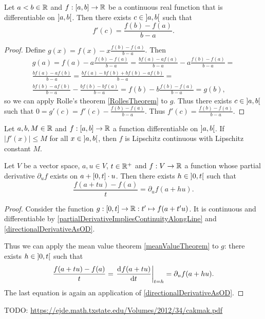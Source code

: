 \begin{theorem} \label{meanValueTheorem}
Let $a<b\in \mathbb{R}$ and $f: \interval{a,b}\to \R$ be a continuous real function that is differentiable on $\interval[o]{a,b}$. Then there exists $c\in \interval[o]{a,b}$ such that
\[f'(c) = \frac{f(b)-f(a)}{b-a}. \]
\end{theorem}
\begin{proof}
Define $g(x) = f(x) - x\frac{f(b)-f(a)}{b-a}$. Then
\begin{multline*}
g(a) = f(a) - a\frac{f(b)-f(a)}{b-a} = \frac{bf(a) - af(a)}{b-a} - a\frac{f(b)-f(a)}{b-a} = \\ \frac{bf(a)-af(b)}{b-a} = \frac{bf(a)-bf(b) + bf(b)-af(b)}{b-a} = \\ \frac{bf(b) - af(b)}{b-a} - \frac{bf(b) - bf(a)}{b-a} = f(b) - b \frac{f(b)-f(a)}{b-a} = g(b),
\end{multline*}
so we can apply Rolle's theorem \ref{RollesTheorem} to $g$. Thus there exists $c\in \interval[o]{a,b}$ such that $0 = g'(c) = f'(c) - \frac{f(b)-f(a)}{b-a}$. Thus $f'(c) = \frac{f(b)-f(a)}{b-a}$.
\end{proof}
\begin{corollary}
Let $a,b, M\in \mathbb{R}$ and $f:\interval{a,b}\to \R$ a function differentiable on $\interval[o]{a,b}$. If $|f'(x)| \leq M$ for all $x\in \interval[o]{a,b}$, then $f$ is Lipschitz continuous with Lipschitz constant $M$.
\end{corollary}
\begin{corollary} \label{partialDerivativeMeanValueTheorem}
Let $V$ be a vector space, $a,u\in V$, $t\in\mathbb{R}^+$ and $f: V\to \mathbb{R}$ a function whose partial derivative $\partial_u f$ exists on $a+\interval{0,t}\cdot u$. Then there exists $h\in \interval[o]{0,t}$ such that
\[ \frac{f(a+tu) - f(a)}{t} = \partial_u f(a+hu). \]
\end{corollary}
\begin{proof}
Consider the function $g: \interval{0,t} \to \R: t'\mapsto f(a+t'u)$. It is continuous and differentiable by \ref{partialDerivativeImpliesContinuityAlongLine} and \ref{directionalDerivativeAsOD}.

Thus we can apply the mean value theorem \ref{meanValueTheorem} to $g$: there exists $h\in \interval[o]{0,t}$ such that
\[ \frac{f(a+tu) - f(a)}{t} = \left.\mathinner{ \dfrac{\operatorname{d \!}{^{}}f(a+tu)}{\operatorname{d \!}{{t}^{}}} }\right|_{t=h} = \partial_u f(a+hu). \]
The last equation is again an application of \ref{directionalDerivativeAsOD}.
\end{proof}

TODO: \url{https://ejde.math.txstate.edu/Volumes/2012/34/cakmak.pdf}

